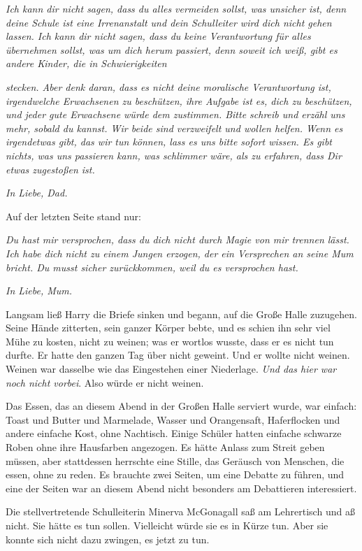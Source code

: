 {\emph{Ich kann dir nicht sagen, dass du alles vermeiden sollst, was unsicher ist, denn deine Schule ist eine Irrenanstalt und dein Schulleiter wird dich nicht gehen lassen. Ich kann dir nicht sagen, dass du keine Verantwortung für alles übernehmen sollst, was um dich herum passiert, denn soweit ich weiß, gibt es andere Kinder, die in Schwierigkeiten}

\emph{stecken. Aber denk daran, dass es nicht deine moralische Verantwortung ist, irgendwelche Erwachsenen zu beschützen, ihre Aufgabe ist es, dich zu beschützen, und jeder gute Erwachsene würde dem zustimmen. Bitte schreib und erzähl uns mehr, sobald du kannst. Wir beide sind verzweifelt und wollen helfen. Wenn es irgendetwas gibt, das wir tun können, lass es uns bitte sofort wissen. Es gibt nichts, was uns passieren kann, was schlimmer wäre, als zu erfahren, dass Dir etwas zugestoßen ist.}

\emph{In Liebe, Dad.}

Auf der letzten Seite stand nur:

\emph{Du hast mir versprochen, dass du dich nicht durch Magie von mir trennen lässt. Ich habe dich nicht zu einem Jungen erzogen, der ein Versprechen an seine Mum bricht. Du musst sicher zurückkommen, weil du es versprochen hast.}

\emph{In Liebe, Mum.}

Langsam ließ Harry die Briefe sinken und begann, auf die Große Halle zuzugehen. Seine Hände zitterten, sein ganzer Körper bebte, und es schien ihn sehr viel Mühe zu kosten, nicht zu weinen; was er wortlos wusste, dass er es nicht tun durfte. Er hatte den ganzen Tag über nicht geweint. Und er wollte nicht weinen. Weinen war dasselbe wie das Eingestehen einer Niederlage. \emph{Und das hier war noch nicht vorbei}. Also würde er nicht weinen.

Das Essen, das an diesem Abend in der Großen Halle serviert wurde, war einfach: Toast und Butter und Marmelade, Wasser und Orangensaft, Haferflocken und andere einfache Kost, ohne Nachtisch. Einige Schüler hatten einfache schwarze Roben ohne ihre Hausfarben angezogen. Es hätte Anlass zum Streit geben müssen, aber stattdessen herrschte eine Stille, das Geräusch von Menschen, die essen, ohne zu reden. Es brauchte zwei Seiten, um eine Debatte zu führen, und eine der Seiten war an diesem Abend nicht besonders am Debattieren interessiert.

Die stellvertretende Schulleiterin Minerva McGonagall saß am Lehrertisch und aß nicht. Sie hätte es tun sollen. Vielleicht würde sie es in Kürze tun. Aber sie konnte sich nicht dazu zwingen, es jetzt zu tun.

}
